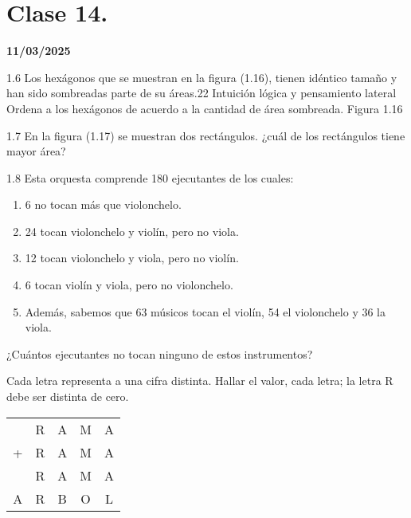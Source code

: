 \section{Clase 14.}
\textbf{11/03/2025}

1.6 Los hexágonos que se muestran en la figura (1.16), tienen idéntico tamaño y han sido sombreadas parte de su áreas.22 Intuición lógica y pensamiento lateral Ordena a los hexágonos de acuerdo a la cantidad de área sombreada. Figura 1.16

1.7 En la figura (1.17) se muestran dos rectángulos. ¿cuál de los rectángulos tiene mayor área?

1.8 Esta orquesta comprende 180 ejecutantes de los cuales:
\begin{enumerate}
    \item 6 no tocan más que violonchelo.
    \item 24 tocan violonchelo y violín, pero no viola.
    \item 12 tocan violonchelo y viola, pero no violín.
    \item 6 tocan violín y viola, pero no violonchelo.
    \item Además, sabemos que 63 músicos tocan el violín, 54 el violonchelo y 36 la viola.
\end{enumerate}
¿Cuántos ejecutantes no tocan ninguno de estos instrumentos?

\begin{minipage}[t]{0.6\textwidth}
     Cada letra representa a una cifra distinta. Hallar el valor, cada letra; la letra R debe ser distinta de cero.
\end{minipage}
\begin{minipage}
    \begin{tabular}{ccccc}
        &R&A&M&A\\
        +&R&A&M&A\\
        &R&A&M&A\\\hline
        A&R&B&O&L
    \end{tabular}
\end{minipage}